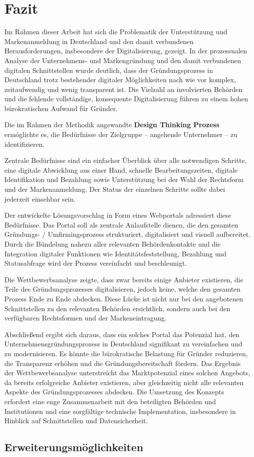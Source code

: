 \newpage

\section{Fazit} \label{fazit}

Im Rahmen dieser Arbeit hat sich die Problematik der Unterstützung und Markenanmeldung in Deutschland und den damit verbundenen Herausforderungen, insbesondere der Digitalisierung, gezeigt.
In der prozessualen Analyse der Unternehmens- und Markengründung und den damit verbundenen digitalen Schnittstellen wurde deutlich, dass der Gründungsprozess in Deutschland trotz bestehender digitaler Möglichkeiten nach wie vor komplex, zeitaufwendig und wenig transparent ist.
Die Vielzahl an involvierten Behörden und die fehlende vollständige, konsequente Digitalisierung führen zu einem hohen bürokratischen Aufwand für Gründer.

Die im Rahmen der Methodik angewandte \textbf{Design Thinking Prozess} ermöglichte es, die Bedürfnisse der Zielgruppe – angehende Unternehmer – zu identifizieren.

Zentrale Bedürfnisse sind ein einfacher Überblick über alle notwendigen Schritte, eine digitale Abwicklung aus einer Hand, schnelle Bearbeitungszeiten, digitale Identifikation und Bezahlung sowie Unterstützung bei der Wahl der Rechtsform und der Markenanmeldung.
Der Status der einzelnen Schritte sollte dabei jederzeit einsehbar sein.

Der entwickelte Lösungsvorschlag in Form eines Webportals adressiert diese Bedürfnisse. Das Portal soll als zentrale Anlaufstelle dienen, die den gesamten Gründungs- / Umfirmingsprozess strukturiert, digitalisiert und visuell aufbereitet.
Durch die Bündelung nahezu  aller relevanten Behördenkontakte und die Integration digitaler Funktionen wie Identitätsfeststellung, Bezahlung und Statusabfrage wird der Prozess vereinfacht und beschleunigt.

Die Wettbewerbsanalyse zeigte, dass zwar bereits einige Anbieter existieren, die Teile des Gründungsprozesses digitalisieren, jedoch keine, welche den gesamten Prozess Ende zu Ende abdecken.
Diese Lücke ist nicht nur bei den angebotenen Schnittstellen zu den relevanten Behörden ersichtlich, sondern auch bei den verfügbaren Rechtsformen und der Markeneintragung.

Abschließend ergibt sich daraus, dass ein solches Portal das Potenzial hat, den Unternehmensgründungsprozess in Deutschland signifikant zu vereinfachen und zu modernisieren.
Es könnte die bürokratische Belastung für Gründer reduzieren, die Transparenz erhöhen und die Gründungsbereitschaft fördern.
Das Ergebnis der Wettbewerbsanalyse unterstreicht das Marktpotenzial eines solchen Angebots, da bereits erfolgreiche Anbieter existieren, aber gleichzeitig nicht alle relevanten Aspekte des Gründungsprozesses abdecken.
Die Umsetzung des Konzepts erfordert eine enge Zusammenarbeit mit den beteiligten Behörden und Institutionen und eine sorgfältige technische Implementation, insbesondere in Hinblick auf Schnittstellen und Datensicherheit.

\subsection{Erweiterungsmöglichkeiten} \label{erweiterungsmoeglichkeiten}
